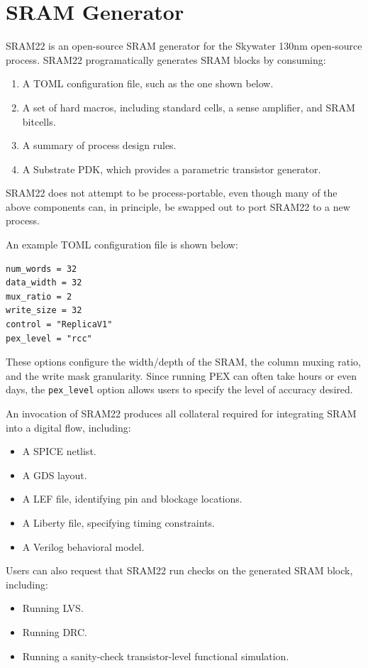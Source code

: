 \chapter{SRAM Generator} \label{sec:sram22}

SRAM22 is an open-source SRAM generator for the Skywater 130nm open-source process.
SRAM22 programatically generates SRAM blocks by consuming:
\begin{enumerate}
\item A TOML configuration file, such as the one shown below.
\item A set of hard macros, including standard cells, a sense amplifier, and SRAM bitcells.
\item A summary of process design rules.
\item A Substrate PDK, which provides a parametric transistor generator.
\end{enumerate}

SRAM22 does not attempt to be process-portable, even though many of the above components
can, in principle, be swapped out to port SRAM22 to a new process.

An example TOML configuration file is shown below:

\begin{verbatim}
num_words = 32
data_width = 32
mux_ratio = 2
write_size = 32
control = "ReplicaV1"
pex_level = "rcc"
\end{verbatim}

These options configure the width/depth of the SRAM, the column muxing ratio, and the write mask granularity.
Since running PEX can often take hours or even days, the \verb|pex_level| option allows users to specify
the level of accuracy desired.

An invocation of SRAM22 produces all collateral required for integrating SRAM into a digital flow, including:
\begin{itemize}
\item A SPICE netlist.
\item A GDS layout.
\item A LEF file, identifying pin and blockage locations.
\item A Liberty file, specifying timing constraints.
\item A Verilog behavioral model.
\end{itemize}

Users can also request that SRAM22 run checks on the generated SRAM block, including:
\begin{itemize}
\item Running LVS.
\item Running DRC.
\item Running a sanity-check transistor-level functional simulation.
\end{itemize}

